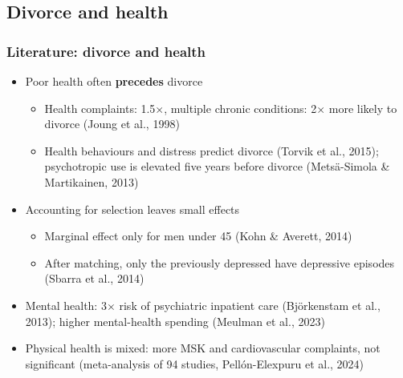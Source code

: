 \documentclass[t,20pt]{beamer}
\newcommand{\hl}[1]{\textcolor{BiBViolett}{\textbf{#1}}}           %
\newcommand{\ct}[1]{{\color{BiBBlau80}(#1)}}                        %
\begin{document}
\subsection{Divorce and health}
\begin{bibframe}
  \frametitle{Literature: divorce and health}
  \begin{itemize}
    \item Poor health often \hl{precedes} divorce
    \begin{itemize}
      \item Health complaints: 1.5$\times$, multiple chronic conditions: 2$\times$ more likely to divorce \ct{Joung et al., 1998}
      \item Health behaviours and distress predict divorce \ct{Torvik et al., 2015}; psychotropic use is elevated five years before divorce \ct{Metsä-Simola \& Martikainen, 2013}
    \end{itemize}
    \item Accounting for selection leaves small effects
    \begin{itemize}
      \item Marginal effect only for men under 45 \ct{Kohn \& Averett, 2014}
      \item After matching, only the previously depressed have depressive episodes \ct{Sbarra et al., 2014}
    \end{itemize}
    \item Mental health: 3$\times$ risk of psychiatric inpatient care \ct{Björkenstam et al., 2013}; higher mental-health spending \ct{Meulman et al., 2023}
    \item Physical health is mixed: more MSK and cardiovascular complaints, not significant \ct{meta-analysis of 94 studies, Pellón-Elexpuru et al., 2024}
  \end{itemize}
\end{bibframe}
\end{document}
